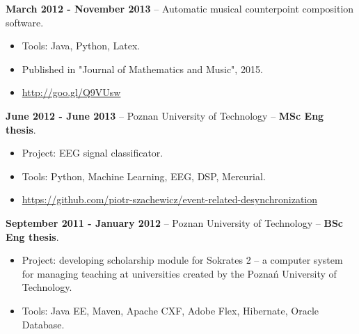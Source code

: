 \documentclass[10pt]{article}
\renewcommand{\section}[2]%
        {\pagebreak[2]\vspace{1.3\baselineskip}%
         \phantomsection\addcontentsline{toc}{section}{#1}%
         \hspace{0in}%
         \marginpar{
         \raggedright \scshape #1}#2}
\begin{document}
\textbf{March 2012 - November 2013} -- Automatic musical counterpoint composition software.  \begin{itemize} \item Tools: Java, Python, Latex.
  \item Published in "Journal of Mathematics and Music", 2015.
  \item \href{http://goo.gl/Q9VUsw}{http://goo.gl/Q9VUsw}
\end{itemize}

\textbf{June 2012 - June 2013} -- Poznan University of Technology -- \textbf{MSc Eng thesis}.
\begin{itemize}
  \item Project: EEG signal classificator.
  \item Tools: Python, Machine Learning, EEG, DSP, Mercurial.
  \item \href{https://github.com/piotr-szachewicz/event-related-desynchronization}{https://github.com/piotr-szachewicz/event-related-desynchronization}
\end{itemize}

\textbf{September 2011 - January 2012} -- Poznan University of Technology -- \textbf{BSc Eng thesis}.
\begin{itemize}
  \item Project: developing scholarship module for Sokrates 2 -- a computer system for managing teaching at universities created by the Poznań University of Technology.
  \item Tools: Java EE, Maven, Apache CXF, Adobe Flex, Hibernate, Oracle Database.
\end{itemize}







\end{document}
